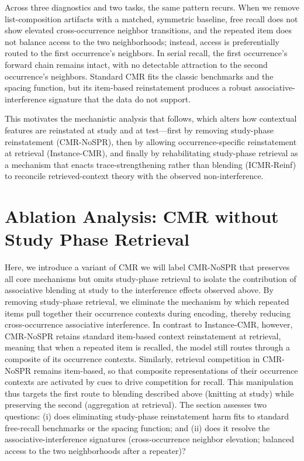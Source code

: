 \documentclass[
  man,
  floatsintext,
  longtable,
  nolmodern,
  notxfonts,
  notimes,
  draftfirst,
  colorlinks=true,linkcolor=blue,citecolor=blue,urlcolor=blue]{apa7}
\begin{document}
Across three diagnostics and two tasks, the same pattern recurs. When we
remove list-composition artifacts with a matched, symmetric baseline,
free recall does not show elevated cross-occurrence neighbor
transitions, and the repeated item does not balance access to the two
neighborhoods; instead, access is preferentially routed to the first
occurrence's neighbors. In serial recall, the first occurrence's forward
chain remains intact, with no detectable attraction to the second
occurrence's neighbors. Standard CMR fits the classic benchmarks and the
spacing function, but its item-based reinstatement produces a robust
associative-interference signature that the data do not support.

This motivates the mechanistic analysis that follows, which alters how
contextual features are reinstated at study and at test---first by
removing study-phase reinstatement (CMR-NoSPR), then by allowing
occurrence-specific reinstatement at retrieval (Instance-CMR), and
finally by rehabilitating study-phase retrieval as a mechanism that
enacts trace-strengthening rather than blending (ICMR-Reinf) to
reconcile retrieved-context theory with the observed non-interference.

\section{Ablation Analysis: CMR without Study Phase
Retrieval}\label{ablation-analysis-cmr-without-study-phase-retrieval}

Here, we introduce a variant of CMR we will label CMR-NoSPR that
preserves all core mechanisms but omits study-phase retrieval to isolate
the contribution of associative blending at study to the interference
effects observed above. By removing study-phase retrieval, we eliminate
the mechanism by which repeated items pull together their occurrence
contexts during encoding, thereby reducing cross-occurrence associative
interference. In contrast to Instance-CMR, however, CMR-NoSPR retains
standard item-based context reinstatement at retrieval, meaning that
when a repeated item is recalled, the model still routes through a
composite of its occurrence contexts. Similarly, retrieval competition
in CMR-NoSPR remains item-based, so that composite representations of
their occurrence contexts are activated by cues to drive competition for
recall. This manipulation thus targets the first route to blending
described above (knitting at study) while preserving the second
(aggregation at retrieval). The section assesses two questions: (i) does
eliminating study-phase reinstatement harm fits to standard free-recall
benchmarks or the spacing function; and (ii) does it resolve the
associative-interference signatures (cross-occurrence neighbor
elevation; balanced access to the two neighborhoods after a repeater)?
\end{document}
